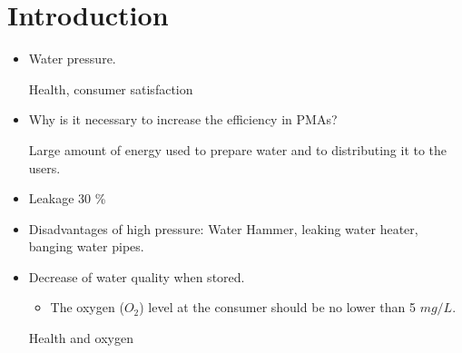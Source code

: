\chapter{Introduction}

 
\begin{itemize}
\item Water pressure. 

Health, consumer satisfaction
\item Why is it necessary to increase the efficiency in PMAs?

Large amount of energy used to prepare water and to distributing it to the users. 
\item Leakage 30 \%
\item Disadvantages of high pressure: Water Hammer, leaking water heater, banging 
water pipes. %
\item Decrease of water quality when stored. 
\begin{itemize}
\item The oxygen ($O_2$) level at the consumer should be no lower than 5 $mg/L$. 
\end{itemize}
Health and oxygen 
\end{itemize}